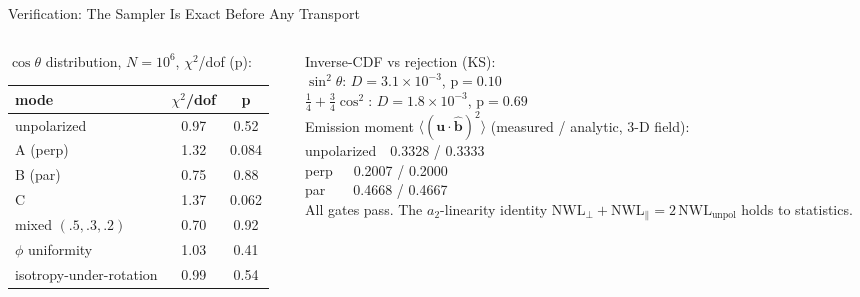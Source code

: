 \documentclass[11pt,aspectratio=169]{beamer}
\newcommand{\bhat}{\hat{\mathbf{b}}}
\begin{document}
\begin{frame}{Verification: The Sampler Is Exact Before Any Transport}
\scriptsize
\begin{columns}[T]
\begin{column}{0.52\textwidth}
$\cos\theta$ distribution, $N=10^6$, $\chi^2$/dof (p):
\begin{tabular}{@{}lcc@{}}
\toprule
mode & $\chi^2$/dof & p \\
\midrule
unpolarized & 0.97 & 0.52 \\
A (perp) & 1.32 & 0.084 \\
B (par) & 0.75 & 0.88 \\
C & 1.37 & 0.062 \\
mixed $(.5,.3,.2)$ & 0.70 & 0.92 \\
\midrule
$\phi$ uniformity & 1.03 & 0.41 \\
isotropy-under-rotation & 0.99 & 0.54 \\
\bottomrule
\end{tabular}
\end{column}
\begin{column}{0.46\textwidth}
Inverse-CDF vs rejection (KS):\\
\quad $\sin^2\theta$: $D=3.1\!\times\!10^{-3}$, p$=0.10$\\
\quad $\tfrac14+\tfrac34\cos^2$: $D=1.8\!\times\!10^{-3}$, p$=0.69$\\[1em]
Emission moment $\langle(\mathbf{u}\!\cdot\!\bhat)^2\rangle$
(measured / analytic, 3-D field):\\
\quad unpolarized\ \ 0.3328 / 0.3333\\
\quad perp\ \ \ 0.2007 / 0.2000\\
\quad par\ \ \ \ 0.4668 / 0.4667\\[1em]
All gates pass. The $a_2$-linearity identity
$\mathrm{NWL}_\perp+\mathrm{NWL}_\parallel = 2\,\mathrm{NWL}_{\text{unpol}}$
holds to statistics.
\end{column}
\end{columns}
\end{frame}
\end{document}
